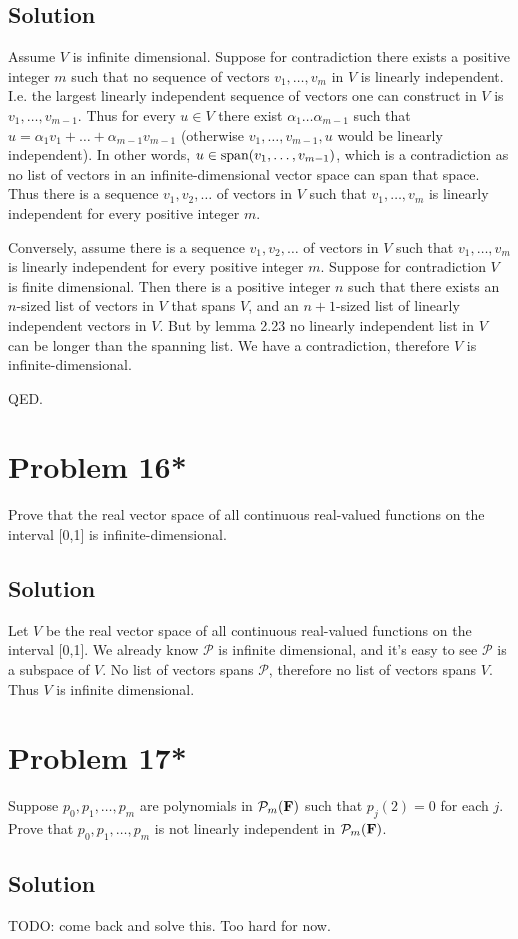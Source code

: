 \documentclass{article}
\begin{document}
\subsection*{Solution}
Assume $V$ is infinite dimensional. Suppose for contradiction there exists a positive integer $m$ such that no sequence of vectors $v_1,\ldots,v_m$ in $V$ is linearly independent. I.e. the largest linearly independent sequence of vectors one can construct in $V$ is $v_1,\ldots,v_{m-1}$. Thus for every $u\in V$ there exist $\alpha_{1}\dots\alpha_{m-1}$ such that $u=\alpha_{1}v_1+\dots+\alpha_{m-1}v_{m-1}$ (otherwise $v_1,\ldots,v_{m-1}, u$ would be linearly independent). In other words, $u\in\text{span}(v_1, \ldots,v_{m-1})$, which is a contradiction as no list of vectors in an infinite-dimensional vector space can span that space. Thus there is a sequence $v_1, v_2, \ldots$ of vectors in $V$ such that $v_1,\ldots,v_m$ is linearly independent for every positive integer $m$.


\vs

Conversely, assume there is a sequence $v_1, v_2, \ldots$ of vectors in $V$ such that $v_1,\ldots,v_m$ is linearly independent for every positive integer $m$. Suppose for contradiction $V$ is finite dimensional. Then there is a positive integer $n$ such that there exists an $n$-sized list of vectors in $V$ that spans $V$, and an $n+1$-sized list of linearly independent vectors in $V$. But by lemma 2.23 no linearly independent list in $V$ can be longer than the spanning list. We have a contradiction, therefore $V$ is infinite-dimensional.

\vs

QED.

\section*{Problem 16*}
Prove that the real vector space of all continuous real-valued functions on the interval [0,1] is infinite-dimensional.

\subsection*{Solution}
Let $V$ be the real vector space of all continuous real-valued functions on the interval [0,1]. We already know $\mathcal{P}$ is infinite dimensional, and it's easy to see $\mathcal{P}$ is a subspace of $V$. No list of vectors spans $\mathcal{P}$, therefore no list of vectors spans $V$. Thus $V$ is infinite dimensional.

\section*{Problem 17*}
Suppose $p_0, p_1, \ldots, p_m$ are polynomials in $\mathcal{P}_m(\mathbf{F})$ such that $p_j(2)=0$ for each $j$. Prove that $p_0, p_1, \ldots, p_m$ is not linearly independent in $\mathcal{P}_m(\mathbf{F})$.

\subsection*{Solution}
TODO: come back and solve this. Too hard for now.
\end{document}
